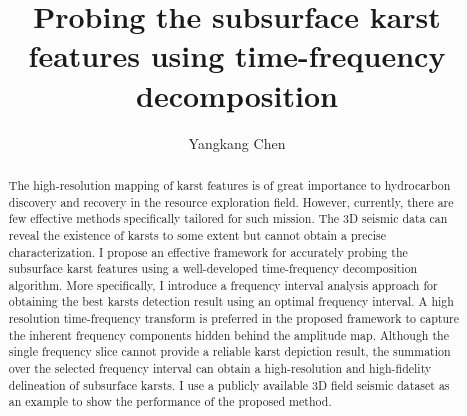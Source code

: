 \title{Probing the subsurface karst features using time-frequency decomposition}

\author{Yangkang Chen\footnotemark[1]}
\address{
\footnotemark[1]Previously: Bureau of Economic Geology \\
John A. and Katherine G. Jackson School of Geosciences \\
The University of Texas at Austin \\
University Station, Box X \\
Austin, TX 78713-8924 \\
chenyk2016@gmail.com,
Currently: National Center for Computational Sciences \\
Oak Ridge National Laboratory \\
One Bethel Valley Road, \\
Oak Ridge, TN 37831-6008 \\
cheny@ornl.gov }

\maketitle

\DeclareRobustCommand{\dlo}[1]{\ifthenelse{\boolean{@revd}}{}{}}
\DeclareRobustCommand{\wen}[1]{%
\ifthenelse{\boolean{@revd}}{\textcolor{black}{#1}}{#1}}


\begin{abstract}
The high-resolution mapping of karst features is of great importance to  hydrocarbon discovery and recovery in the resource exploration field. However, currently, there are few effective methods specifically tailored for such mission. The 3D seismic data can reveal the existence of karsts to some extent but cannot obtain a precise characterization. I propose an effective framework for accurately probing the subsurface karst features using a well-developed time-frequency decomposition algorithm. More specifically, I introduce a frequency interval analysis approach for obtaining the best karsts detection result using an optimal frequency interval. A high resolution time-frequency transform is preferred in the proposed framework to capture the inherent frequency components hidden behind the amplitude map. Although the single frequency slice cannot provide a reliable karst depiction result, the summation over the selected frequency interval can obtain a high-resolution and high-fidelity delineation of subsurface karsts. I use a publicly available 3D field seismic dataset as an example to show the performance of the proposed method.  
\end{abstract}

